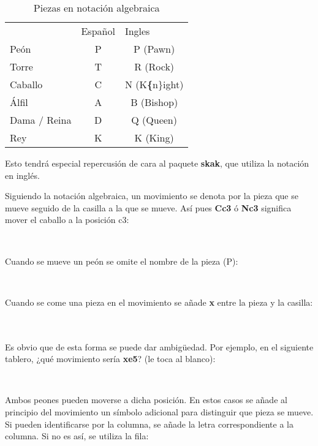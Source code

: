 \documentclass{article}
\begin{document}
\begin{table}[h]
	\centering
	\caption{Piezas en notación algebraica}
	\label{my-label}
	\begin{tabular}{lcc}
		\textbf{}    & \multicolumn{1}{l}{Español} & \multicolumn{1}{l}{Ingles} \\
		Peón         & P                           & P (Pawn)                   \\
		Torre        & T                           & R (Rock)                   \\
		Caballo      & C                           & N (K\textbf\{n\}ight)      \\
		Álfil        & A                           & B (Bishop)                 \\
		Dama / Reina & D                           & Q (Queen)                  \\
		Rey          & K                           & K (King)                  
	\end{tabular}
\end{table}

Esto tendrá especial repercusión de cara al paquete \textbf{skak}, que utiliza la notación en inglés.

Siguiendo la notación algebraica, un movimiento se denota por la pieza que se mueve seguido de la casilla a la que se mueve. Así pues \textbf{Cc3} ó \textbf{Nc3} significa mover el caballo a la posición c3:

\newgame
{} \\
\showboard

Cuando se mueve un peón se omite el nombre de la pieza (P):

 \\
\showboard

Cuando se come una pieza en el movimiento se añade \textbf{x} entre la pieza y la casilla:

 \\
\showboard \\

Es obvio que de esta forma se puede dar ambigüedad. Por ejemplo, en el siguiente tablero, ¿qué movimiento sería \textbf{xe5}? (le toca al blanco):

\newgame
{} \\
\showboard

Ambos peones pueden moverse a dicha posición. En estos casos se añade al principio del movimiento un símbolo adicional para distinguir que pieza se mueve. Si pueden identificarse por la columna, se añade la letra correspondiente a la columna. Si no es así, se utiliza la fila:
\end{document}

